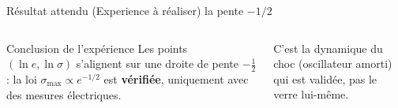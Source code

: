 \documentclass[11pt,aspectratio=169]{beamer}
\begin{document}
\begin{frame}{Résultat attendu (Experience à réaliser) la pente $-1/2$}
  \begin{columns}[c]
    \centering
    \footnotesize
    \begin{block}{Conclusion de l'expérience}
    Les points $(\ln e,\ln\sigma)$ s'alignent sur une droite de pente
    $\boxed{-\tfrac12}$ : la loi $\sigma_{\max}\propto e^{-1/2}$ est
    \textbf{vérifiée}, uniquement avec des mesures électriques.
    \end{block}
    \scriptsize C'est la dynamique du choc (oscillateur amorti) qui est validée,
    pas le verre lui-même.
  \end{columns}
\end{frame}
\end{document}
